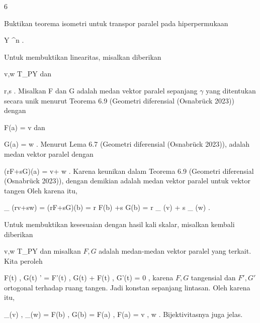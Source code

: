 {6}

{

Buktikan teorema isometri untuk transpor paralel pada hiperpermukaan

\mavergleichskette
{\vergleichskette
{ Y
}
{ \subseteq }{ \R^n
}
{  }{
}
{    }{
}
{   }{
}
}
{}{}{.}

}
{

Untuk membuktikan linearitas, misalkan diberikan

\mavergleichskette
{\vergleichskette
{ v,w
}
{ \in }{ T_PY
}
{  }{
}
{    }{
}
{   }{
}
}
{}{}{}
dan

\mavergleichskette
{\vergleichskette
{ r,s
}
{ \in }{ \R
}
{  }{
}
{    }{
}
{   }{
}
}
{}{}{}.
Misalkan
\mathkor {} {F} {dan} {G} {}
adalah medan vektor paralel sepanjang $\gamma$ yang ditentukan secara unik menurut
Teorema 6.9 (Geometri diferensial (Osnabrück 2023))
dengan

\mavergleichskette
{\vergleichskette
{ F(a)
}
{ = }{ v
}
{  }{
}
{    }{
}
{   }{
}
}
{}{}{}
dan

\mavergleichskette
{\vergleichskette
{ G(a)
}
{ = }{ w
}
{  }{
}
{    }{
}
{   }{
}
}
{}{}{.}
Menurut
Lema 6.7 (Geometri diferensial (Osnabrück 2023)),
 adalah medan vektor paralel dengan

\mavergleichskette
{\vergleichskette
{ (rF+sG)(a)
}
{ = }{ v+ w
}
{  }{
}
{    }{
}
{   }{
}
}
{}{}{.}
Karena keunikan dalam
Teorema 6.9 (Geometri diferensial (Osnabrück 2023)),
 dengan demikian adalah medan vektor paralel untuk vektor tangen
 Oleh karena itu,

\mavergleichskettedisp
{\vergleichskette
{ \Psi_{\gamma} (rv+sw)
}
{ =} { (rF+sG)(b)
}
{ =} { r F(b) +s G(b)
}
{ =} { r \Psi_{\gamma} (v) + s \Psi_{\gamma} (w)
}
{ } {
}
}
{}{}{.}

Untuk membuktikan kesesuaian dengan hasil kali skalar, misalkan kembali diberikan

\mavergleichskette
{\vergleichskette
{ v,w
}
{ \in }{ T_PY
}
{  }{
}
{    }{
}
{   }{
}
}
{}{}{}
dan misalkan $F,G$ adalah medan-medan vektor paralel yang terkait. Kita peroleh

\mavergleichskettedisp
{\vergleichskette
{ \left\langle  F(t) , G(t)  \right\rangle'
}
{ =} { \left\langle  F'(t) , G(t)  \right\rangle  +  \left\langle  F(t) , G'(t)  \right\rangle
}
{ =} { 0
}
{ } {
}
{ } {
}
}
{}{}{,}
karena $F,G$ tangensial dan $F',G'$ ortogonal terhadap ruang tangen. Jadi
 konstan sepanjang lintasan. Oleh karena itu,

\mavergleichskettedisp
{\vergleichskette
{ \left\langle \Psi_\gamma(v)  , \Psi_\gamma(w)  \right\rangle
}
{ =} { \left\langle  F(b)  ,  G(b)   \right\rangle
}
{ =} { \left\langle  F(a)  ,  F(a)   \right\rangle
}
{ =} { \left\langle  v  , w  \right\rangle
}
{ } {
}
}
{}{}{.}
Bijektivitasnya juga jelas.

 }



